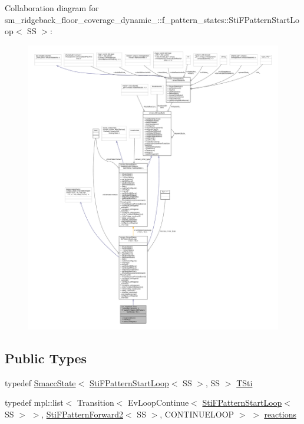 Collaboration diagram for sm\+\_\+ridgeback\+\_\+floor\+\_\+coverage\+\_\+dynamic\+\_\+:\+:f\+\_\+pattern\+\_\+states\+:\+:Sti\+F\+Pattern\+Start\+Loop$<$ SS $>$\+:
\nopagebreak
\begin{figure}[H]
\begin{center}
\leavevmode
\includegraphics[width=350pt]{structsm__ridgeback__floor__coverage__dynamic__1_1_1f__pattern__states_1_1StiFPatternStartLoop__coll__graph}
\end{center}
\end{figure}
\subsection*{Public Types}
\begin{DoxyCompactItemize}
\item 
typedef \hyperlink{classSmaccState}{Smacc\+State}$<$ \hyperlink{structsm__ridgeback__floor__coverage__dynamic__1_1_1f__pattern__states_1_1StiFPatternStartLoop}{Sti\+F\+Pattern\+Start\+Loop}$<$ SS $>$, SS $>$ \hyperlink{structsm__ridgeback__floor__coverage__dynamic__1_1_1f__pattern__states_1_1StiFPatternStartLoop_a6e8112bd4cff26ef9b16daf8667d0a51}{T\+Sti}
\item 
typedef mpl\+::list$<$ Transition$<$ Ev\+Loop\+Continue$<$ \hyperlink{structsm__ridgeback__floor__coverage__dynamic__1_1_1f__pattern__states_1_1StiFPatternStartLoop}{Sti\+F\+Pattern\+Start\+Loop}$<$ SS $>$ $>$, \hyperlink{structsm__ridgeback__floor__coverage__dynamic__1_1_1f__pattern__states_1_1StiFPatternForward2}{Sti\+F\+Pattern\+Forward2}$<$ SS $>$, C\+O\+N\+T\+I\+N\+U\+E\+L\+O\+OP $>$ $>$ \hyperlink{structsm__ridgeback__floor__coverage__dynamic__1_1_1f__pattern__states_1_1StiFPatternStartLoop_a175a0b5dc6f8793d7bc19d5f46b8656f}{reactions}
\end{DoxyCompactItemize}
